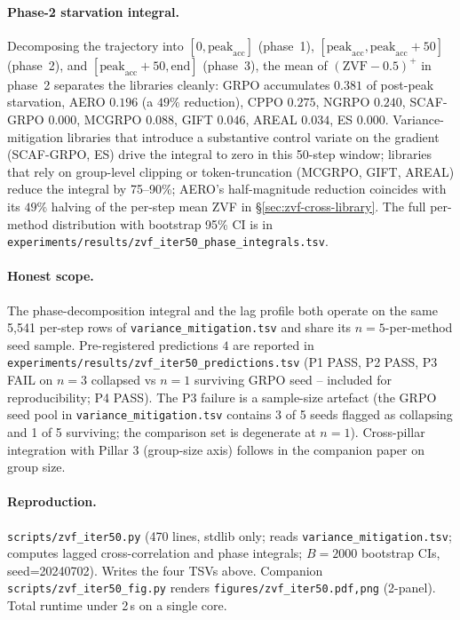 \documentclass{article}
\begin{document}
\paragraph{Phase-2 starvation integral.}
Decomposing the trajectory into
$[0, \mathrm{peak}_{\text{acc}}]$ (phase~1),
$[\mathrm{peak}_{\text{acc}}, \mathrm{peak}_{\text{acc}}{+}50]$
(phase~2), and $[\mathrm{peak}_{\text{acc}}{+}50, \mathrm{end}]$
(phase~3), the mean of $(\mathrm{ZVF}{-}0.5)^+$ in phase~2 separates
the libraries cleanly:
GRPO accumulates $0.381$ of post-peak starvation, AERO $0.196$
(a $49\%$ reduction), CPPO $0.275$, NGRPO $0.240$, SCAF-GRPO $0.000$,
MCGRPO $0.088$, GIFT $0.046$, AREAL $0.034$, ES $0.000$.
Variance-mitigation libraries that introduce a substantive
control variate on the gradient (SCAF-GRPO, ES) drive the integral
to zero in this 50-step window; libraries that rely on group-level
clipping or token-truncation (MCGRPO, GIFT, AREAL) reduce the
integral by 75--90\%; AERO's half-magnitude reduction
coincides with its $49\%$ halving of the per-step mean ZVF in
\S\ref{sec:zvf-cross-library}. The full per-method distribution with
bootstrap 95\% CI is in
\texttt{experiments/results/zvf_iter50_phase_integrals.tsv}.

\paragraph{Honest scope.}
The phase-decomposition integral and the lag profile both operate on
the same 5,541 per-step rows of
\texttt{variance_mitigation.tsv} and share its
$n{=}5$-per-method seed sample. Pre-registered predictions
$4$ are reported in
\texttt{experiments/results/zvf_iter50_predictions.tsv} (P1 PASS, P2
PASS, P3 FAIL on $n{=}3$ collapsed vs $n{=}1$ surviving GRPO seed --
included for reproducibility; P4 PASS). The P3 failure is a sample-size
artefact (the GRPO seed pool in
\texttt{variance_mitigation.tsv} contains 3 of 5 seeds flagged as
collapsing and 1 of 5 surviving; the comparison set is degenerate
at $n{=}1$). Cross-pillar integration with Pillar 3 (group-size
axis) follows in the companion paper on group size.

\paragraph{Reproduction.}
\texttt{scripts/zvf_iter50.py} (470 lines, stdlib only; reads
\texttt{variance_mitigation.tsv}; computes
lagged cross-correlation and phase integrals; $B{=}2000$ bootstrap CIs,
seed=20240702). Writes the four TSVs above. Companion
\texttt{scripts/zvf_iter50_fig.py} renders
\texttt{figures/zvf_iter50.{pdf,png}} (2-panel). Total runtime under
2\,s on a single core.
 
\end{document}
